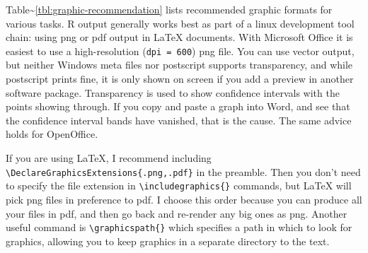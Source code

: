 \begin{Shaded}
\begin{Highlighting}[]
 
\NormalTok{(} \NormalTok{)}

\NormalTok{(} \NormalTok{, } \NormalTok{, } \NormalTok{)}
 
 
\NormalTok{()}
\end{Highlighting}
\end{Shaded}

Table\textasciitilde{}\ref{tbl:graphic-recommendation} lists recommended
graphic formats for various tasks. R output generally works best as part
of a linux development tool chain: using png or pdf output in LaTeX
documents. With Microsoft Office it is easiest to use a high-resolution
(\texttt{dpi = 600}) png file. You can use vector output, but neither
Windows meta files nor postscript supports transparency, and while
postscript prints fine, it is only shown on screen if you add a preview
in another software package. Transparency is used to show confidence
intervals with the points showing through. If you copy and paste a graph
into Word, and see that the confidence interval bands have vanished,
that is the cause. The same advice holds for OpenOffice.
 

If you are using LaTeX, I recommend including
\texttt{\textbackslash{}DeclareGraphicsExtensions\{.png,.pdf\}} in the
preamble. Then you don't need to specify the file extension in
\texttt{\textbackslash{}includegraphics\{\}} commands, but LaTeX will
pick png files in preference to pdf.  I choose
this order because you can produce all your files in pdf, and then go
back and re-render any big ones as png. Another useful command is
\texttt{\textbackslash{}graphicspath\{\}} which specifies a path in
which to look for graphics, allowing you to keep graphics in a separate
directory to the text.

